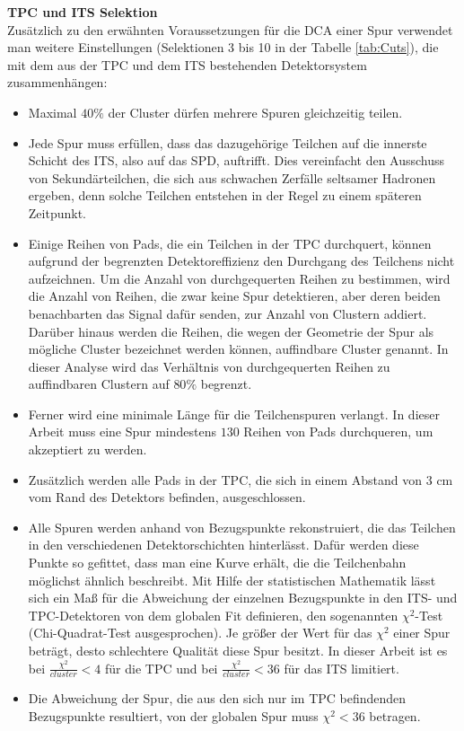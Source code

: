 \documentclass[12pt,a4paper]{report}
\begin{document}
\textbf{TPC und ITS Selektion}\\
Zusätzlich zu den erwähnten Voraussetzungen für die DCA einer Spur verwendet man weitere Einstellungen (Selektionen 3 bis 10 in der Tabelle \ref{tab:Cuts}), die mit dem aus der TPC und dem ITS bestehenden Detektorsystem zusammenhängen:
\begin{itemize}
 \item Maximal $40\%$ der Cluster dürfen mehrere Spuren gleichzeitig teilen.
  \item Jede Spur muss erfüllen, dass das dazugehörige Teilchen auf die innerste Schicht des ITS, also auf das SPD, auftrifft. Dies vereinfacht den Ausschuss von Sekundärteilchen, die sich aus schwachen Zerfälle seltsamer Hadronen ergeben, denn solche Teilchen entstehen in der Regel zu einem späteren Zeitpunkt.
 \item Einige Reihen von Pads, die ein Teilchen in der TPC durchquert, können aufgrund der begrenzten Detektoreffizienz den Durchgang des Teilchens nicht aufzeichnen. Um die Anzahl von durchgequerten Reihen zu bestimmen, wird die Anzahl von Reihen, die zwar keine Spur detektieren, aber deren beiden benachbarten das Signal dafür senden, zur Anzahl von Clustern addiert. Darüber hinaus werden die Reihen, die wegen der Geometrie der Spur als mögliche Cluster bezeichnet werden können, auffindbare Cluster genannt. In dieser Analyse wird das Verhältnis von durchgequerten Reihen zu auffindbaren Clustern auf $80\%$ begrenzt.
 \item Ferner wird eine minimale Länge für die Teilchenspuren verlangt. In dieser Arbeit muss eine Spur mindestens $130$ Reihen von Pads durchqueren, um akzeptiert zu werden.
 \item Zusätzlich werden alle Pads in der TPC, die sich in einem Abstand von $3$ cm vom Rand des Detektors befinden, ausgeschlossen.
 \item Alle Spuren werden anhand von Bezugspunkte rekonstruiert, die das Teilchen in den verschiedenen Detektorschichten hinterlässt. Dafür werden diese Punkte so gefittet, dass man eine Kurve erhält, die die Teilchenbahn möglichst ähnlich beschreibt. Mit Hilfe der statistischen Mathematik lässt sich ein Maß für die Abweichung der einzelnen Bezugspunkte in den ITS- und TPC-Detektoren von dem globalen Fit definieren, den sogenannten $\chi^2$-Test (Chi-Quadrat-Test ausgesprochen). Je größer der Wert für das $\chi^2$ einer Spur beträgt, desto schlechtere Qualität diese Spur besitzt. In dieser Arbeit ist es bei $\tfrac{\chi^2}{cluster} < 4$ für die TPC und bei $\tfrac{\chi^2}{cluster} < 36$ für das ITS limitiert.
 \item Die Abweichung der Spur, die aus den sich nur im TPC befindenden Bezugspunkte resultiert, von der globalen Spur muss $\chi^2 < 36$ betragen.
\end{itemize}
\end{document}
